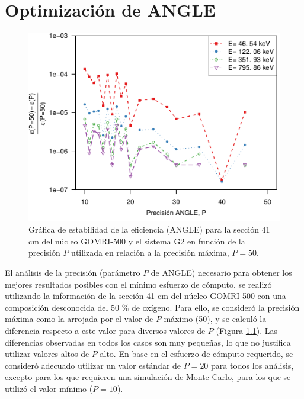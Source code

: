 \chapter{Optimización de ANGLE}\label{SecOptANGLE}
\begin{figure}
\centering
\includegraphics[width = \textwidth]{Imagenes/Eficiencia-precision-DiffPorcentual.pdf}
\caption{Gráfica de estabilidad de la eficiencia (ANGLE) para la sección 41 cm del núcleo GOMRI-500 y el sistema G2 en función de la precisión $P$ utilizada en relación a la precisión máxima, $P=50$.}\label{Fig-OptimizacionANGLE}
\end{figure}
\lettrine{E}{}l análisis de la precisión (parámetro $P$ de ANGLE) necesario para obtener los mejores resultados posibles con el mínimo esfuerzo de cómputo, se realizó utilizando la información de la sección 41 cm del núcleo GOMRI-500 con una composición desconocida del 50 \% de oxígeno. Para ello, se consideró la precisión máxima como la arrojada por el valor de $P$ máximo (50), y se calculó la diferencia respecto a este valor para diversos valores de $P$ (Figura \ref{Fig-OptimizacionANGLE}). Las diferencias observadas en todos los casos son muy pequeñas, lo que no justifica utilizar valores altos de $P$ alto. En base en el esfuerzo de cómputo requerido, se consideró adecuado utilizar un valor estándar de $P = 20$ para todos los análisis, excepto para los que requieren una simulación de Monte Carlo, para los que se utilizó el valor mínimo ($P=10$).